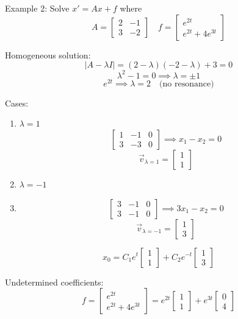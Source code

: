 \documentclass[12pt]{article}
\begin{document}
Example 2: Solve $x' = Ax + f$ where
\[A = \begin{bmatrix}
    2 & -1\\
    3 & -2
\end{bmatrix} \quad f = \begin{bmatrix}
    e^{2t}\\
    e^{2t} + 4e^{3t}
\end{bmatrix}\]

Homogeneous solution:
\[|A - \lambda I| = (2 - \lambda)(-2 - \lambda) + 3 = 0\]
\[\lambda^2 - 1 = 0 \implies \lambda = \pm 1\]
\[e^{2t} \implies \lambda = 2 \quad \text{(no resonance)}\]

Cases:
\begin{enumerate}
    \item $\lambda = 1$
    \[\begin{bmatrix}
        1 & -1 & 0\\
        3 & -3 & 0
    \end{bmatrix} \implies x_1 - x_2 = 0\]
    \[\vec{v}_{\lambda = 1} = \begin{bmatrix}
        1\\1
    \end{bmatrix}\]

    \item $\lambda = -1$
    \item \[\begin{bmatrix}
        3 & -1 & 0\\
        3 & -1 & 0
    \end{bmatrix} \implies 3x_1 - x_2 = 0\]
    \[\vec{v}_{\lambda = -1} = \begin{bmatrix}
        1\\3
    \end{bmatrix}\]
\end{enumerate}

\[x_0 = C_1 e^{t} \begin{bmatrix}
    1\\1
\end{bmatrix} + C_2 e^{-t} \begin{bmatrix}
    1\\3
\end{bmatrix}\]

Undetermined coefficients:
\[f = \begin{bmatrix}
    e^{2t}\\
    e^{2t} + 4e^{3t}
\end{bmatrix} = e^{2t} \begin{bmatrix}
    1\\1
\end{bmatrix} + e^{3t} \begin{bmatrix}
    0\\4
\end{bmatrix}\]
\end{document}

